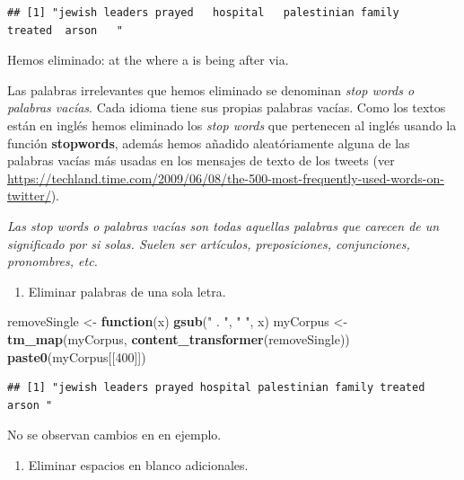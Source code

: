 \documentclass[
]{article}
\newenvironment{Shaded}{\begin{snugshade}}{\end{snugshade}}
\newcommand{\ControlFlowTok}[1]{\textcolor[rgb]{0.13,0.29,0.53}{\textbf{#1}}}
\newcommand{\DecValTok}[1]{\textcolor[rgb]{0.00,0.00,0.81}{#1}}
\newcommand{\KeywordTok}[1]{\textcolor[rgb]{0.13,0.29,0.53}{\textbf{#1}}}
\newcommand{\NormalTok}[1]{#1}
\newcommand{\StringTok}[1]{\textcolor[rgb]{0.31,0.60,0.02}{#1}}
\providecommand{\tightlist}{%
  \setlength{\itemsep}{0pt}\setlength{\parskip}{0pt}}
\begin{document}
\begin{verbatim}
## [1] "jewish leaders prayed   hospital   palestinian family   treated  arson   "
\end{verbatim}

Hemos eliminado: at the where a is being after via.

Las palabras irrelevantes que hemos eliminado se denominan \emph{stop
words o palabras vacías}. Cada idioma tiene sus propias palabras vacías.
Como los textos están en inglés hemos eliminado los \emph{stop words}
que pertenecen al inglés usando la función \textbf{stopwords}, además
hemos añadido aleatóriamente alguna de las palabras vacías más usadas en
los mensajes de texto de los tweets (ver
\url{https://techland.time.com/2009/06/08/the-500-most-frequently-used-words-on-twitter/}).

\emph{Las stop words o palabras vacías son todas aquellas palabras que
carecen de un significado por si solas. Suelen ser artículos,
preposiciones, conjunciones, pronombres, etc.}

\begin{enumerate}
\def\labelenumi{\arabic{enumi}.}
\setcounter{enumi}{5}
\tightlist
\item
  Eliminar palabras de una sola letra.
\end{enumerate}

\begin{Shaded}
\begin{Highlighting}[]
\NormalTok{removeSingle <-}\StringTok{ }\ControlFlowTok{function}\NormalTok{(x) }\KeywordTok{gsub}\NormalTok{(}\StringTok{" . "}\NormalTok{, }\StringTok{" "}\NormalTok{, x)   }
\NormalTok{myCorpus <-}\StringTok{ }\KeywordTok{tm_map}\NormalTok{(myCorpus, }\KeywordTok{content_transformer}\NormalTok{(removeSingle))}
\KeywordTok{paste0}\NormalTok{(myCorpus[[}\DecValTok{400}\NormalTok{]])}
\end{Highlighting}
\end{Shaded}

\begin{verbatim}
## [1] "jewish leaders prayed hospital palestinian family treated  arson "
\end{verbatim}

No se observan cambios en en ejemplo.

\begin{enumerate}
\def\labelenumi{\arabic{enumi}.}
\setcounter{enumi}{6}
\tightlist
\item
  Eliminar espacios en blanco adicionales.
\end{enumerate}
\end{document}
